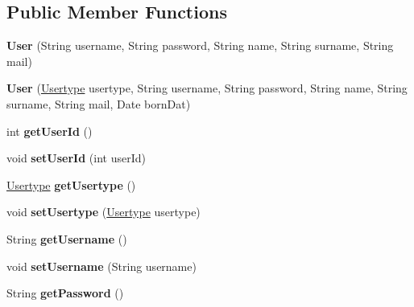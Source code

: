 \subsection*{Public Member Functions}
\begin{DoxyCompactItemize}
\item 
\mbox{\label{classentity_1_1_user_a930c504e6004ddb37035544fbd904166}} 
{\bfseries User} (String username, String password, String name, String surname, String mail)
\item 
\mbox{\label{classentity_1_1_user_a030c1335a60b60d90e731b1438292d3b}} 
{\bfseries User} (\mbox{\hyperlink{classentity_1_1_usertype}{Usertype}} usertype, String username, String password, String name, String surname, String mail, Date born\+Dat)
\item 
\mbox{\label{classentity_1_1_user_a4004338c97a54b7a80369b5aad8fad0f}} 
int {\bfseries get\+User\+Id} ()
\item 
\mbox{\label{classentity_1_1_user_a58e8f4d8e357810b972d52dc1383013e}} 
void {\bfseries set\+User\+Id} (int user\+Id)
\item 
\mbox{\label{classentity_1_1_user_a050e73c7a9b10da8cec45c60afe9b942}} 
\mbox{\hyperlink{classentity_1_1_usertype}{Usertype}} {\bfseries get\+Usertype} ()
\item 
\mbox{\label{classentity_1_1_user_a0981e69a22d9baed58f63d8e757ae7a7}} 
void {\bfseries set\+Usertype} (\mbox{\hyperlink{classentity_1_1_usertype}{Usertype}} usertype)
\item 
\mbox{\label{classentity_1_1_user_a346d96c8b90b4ba0446170f2bf913be8}} 
String {\bfseries get\+Username} ()
\item 
\mbox{\label{classentity_1_1_user_a1b88018038c39d85b2e500f5134ca7c5}} 
void {\bfseries set\+Username} (String username)
\item 
\mbox{\label{classentity_1_1_user_ac45f7a1da720c4bcc21ce365c29a74b4}} 
String {\bfseries get\+Password} ()
\item 

\end{DoxyCompactItemize}
